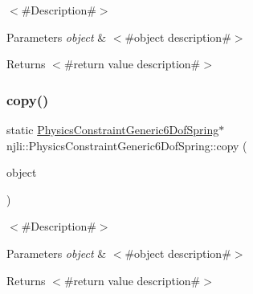 $<$\#\+Description\#$>$


\begin{DoxyParams}{Parameters}
{\em object} & $<$\#object description\#$>$\\
\hline
\end{DoxyParams}
\begin{DoxyReturn}{Returns}
$<$\#return value description\#$>$ 
\end{DoxyReturn}
\mbox{\label{classnjli_1_1_physics_constraint_generic6_dof_spring_ad0f3a2c25060758c236a7341d45ec471}} 
\subsubsection{\texorpdfstring{copy()}{copy()}}
{\footnotesize\ttfamily static \mbox{\hyperlink{classnjli_1_1_physics_constraint_generic6_dof_spring}{Physics\+Constraint\+Generic6\+Dof\+Spring}}$\ast$ njli\+::\+Physics\+Constraint\+Generic6\+Dof\+Spring\+::copy (\begin{DoxyParamCaption}\item[{const \mbox{\hyperlink{classnjli_1_1_physics_constraint_generic6_dof_spring}{Physics\+Constraint\+Generic6\+Dof\+Spring}} \&}]{object }\end{DoxyParamCaption})\hspace{0.3cm}{\ttfamily [static]}}

$<$\#\+Description\#$>$


\begin{DoxyParams}{Parameters}
{\em object} & $<$\#object description\#$>$\\
\hline
\end{DoxyParams}
\begin{DoxyReturn}{Returns}
$<$\#return value description\#$>$ 
\end{DoxyReturn}
\mbox{\label{classnjli_1_1_physics_constraint_generic6_dof_spring_a8a50fb176c1795f70770c7736b4b4f61}} 
